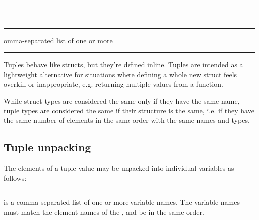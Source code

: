 \begin{grammar}
\rule{tuple-type} \code{(}  \code{)}\\
\rule{tuple-element-list} comma-separated list of one or more \\
\rule{tuple-element}  \code{:} 
\end{grammar}

Tuples behave like structs, but they're defined inline. Tuples are intended as
a lightweight alternative for situations where defining a whole new struct feels
overkill or inappropriate, e.g. returning multiple values from a function.

While struct types are considered the same only if they have the same name,
tuple types are considered the same if their structure is the same, i.e. if they
have the same number of elements in the same order with the same names and
types.

\subsection{Tuple unpacking}

The elements of a tuple value may be unpacked into individual variables as
follows:

\begin{grammar}
\rule{tuple-unpack-statement}  \code{=}  \code{;}
\end{grammar}

 is a comma-separated list of one or more variable
names. The variable names must match the element names of the
, and be in the same order.

